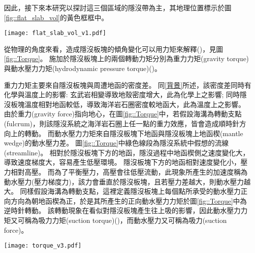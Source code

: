 因此，接下來本研究以探討這三個區域的隱沒帶為主，其地理位置標示於圖\ref{fig::flat_slab_vol}的黃色框框中。

\begin{figure*}[hp]
    \centering
    \texttt{[image: flat\_slab\_vol\_v1.pdf]}
    \caption[研究區域板塊構造圖]{研究區域板塊構造圖，灰色實線為板塊邊界，資料來自\citet{bird2003updated}，橘紅色三角形為火山分佈，資料來自\citet{venzke2013global}，黑色虛線為每50公里深之板塊等深度線，其中50、100與150公里等深度線加粗，資料來自\citet{hayes2018slab2}。黃色框框圈起處為本研究所定義的平坦隱沒位置，由北到南分別位於墨西哥、秘魯與智利。
    }
    \label{fig::flat_slab_vol}
\end{figure*}

從物理的角度來看，造成隱沒板塊的傾角變化可以用力矩來解釋(\citealp{stevenson1977angle})，見圖\ref{fig::Torque}。
施加於隱沒板塊上的兩個轉動力矩分別為重力力矩(gravity torque)與動水壓力力矩(hydrodynamic pressure torque)(\citealp{McKenzie1969})。

重力力矩主要來自隱沒板塊與周遭地函的密度差。
同\ref{背景}所述，該密度差同時有化學與溫度上的影響: 玄武岩相變導致地殼密度增大，此為化學上之影響; 同時隱沒板塊溫度相對地函較低，導致海洋岩石圈密度較地函大，此為溫度上之影響。
由於重力(gravity force)指向地心，在圖\ref{fig::Torque}中，若假設海溝為轉動支點(fulcrum)，則該隱沒系統之海洋岩石圈上任一點的重力效應，皆會造成順時針方向上的轉動。
而動水壓力力矩來自隱沒板塊下地函與隱沒板塊上地函楔(mantle wedge)的動水壓力差。
圖\ref{fig::Torque}中綠色線段為隱沒系統中假想的流線(streamline)。
相對於隱沒板塊下方的地函，隱沒過程中地函楔側之速度變化大，導致速度梯度大，容易產生低壓環境。
隱沒板塊下方的地函相對速度變化小，壓力相對高壓。
而為了平衡壓力，高壓會往低壓流動，此現象所產生的加速度稱為動水壓力(壓力梯度力)，該力會垂直於隱沒板塊，且若壓力差越大，則動水壓力越大。
同樣假設海溝為轉動支點，這裡定義隱沒板塊上每個點所承受的動水壓力正向方向為朝地函楔為正，於是其所產生的正向動水壓力力矩於圖\ref{fig::Torque}中為逆時針轉動。
該轉動現象在看似對隱沒板塊產生往上吸的影響，因此動水壓力力矩又可稱為吸力力矩(suction torque)(\citealp{tovish1978mantle})，而動水壓力又可稱為吸力(suction force)。

\begin{figure*}[ht!]
    \centering
    \texttt{[image: torque\_v3.pdf]}
    \caption[隱沒系統中施加於隱沒板塊上的轉動力矩]{隱沒系統中施加於隱沒板塊上的轉動力矩，包含重力力矩與動水壓力力矩。綠色線為軟流圈(asthenosphere)中的假想流線，灰圓底紅字H代表高壓區，灰圓底藍字代表低壓區。假設海溝為支點，大於0之重力力矩在該系統中施予一順時針方向上的轉動，反之大於0之動水壓力力矩施予一逆時針方向上的轉動。
    }
    \label{fig::Torque}
\end{figure*}

